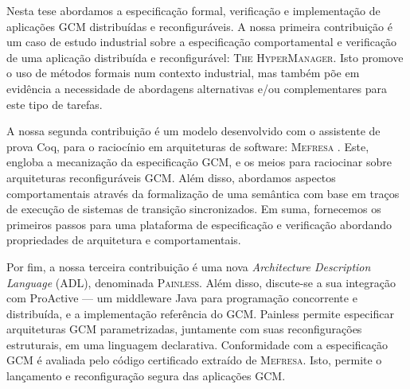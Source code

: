 Nesta tese abordamos a especificação formal, verificação e implementação de 
aplicações GCM distribuídas e reconfiguráveis​​. A nossa primeira contribuição é um caso de estudo industrial 
sobre a especificação comportamental e verificação de uma 
aplicação distribuída e reconfigurável: \textsc{The HyperManager}. 
Isto promove o uso de métodos formais num contexto industrial, 
mas também põe em evidência a necessidade de abordagens alternativas e/ou complementares 
para este tipo de tarefas. 

A nossa segunda contribuição é um modelo desenvolvido com o assistente de prova Coq, 
para o raciocínio em arquiteturas de software: \textsc{Mefresa} . Este, engloba 
a mecanização da especificação GCM, e os meios para 
raciocinar sobre arquiteturas reconfiguráveis ​​GCM. Além disso, abordamos 
aspectos comportamentais através da formalização de uma semântica com base em traços de execução de 
sistemas de transição sincronizados. 
Em suma, fornecemos os primeiros passos para uma plataforma de especificação e verificação 
abordando propriedades de arquitetura e comportamentais. 

Por fim, a nossa terceira contribuição é uma nova \textit{Architecture Description Language} (ADL), 
denominada \textsc{Painless}. Além disso, discute-se a sua integração com \textsf{ProActive} 
--- um middleware Java para programação concorrente e distribuída, 
e a implementação referência do GCM. 
\textsf{Painless} permite especificar arquiteturas GCM parametrizadas, juntamente com 
suas reconfigurações estruturais, em uma linguagem declarativa. Conformidade 
com a especificação GCM é avaliada pelo código certificado extraído de \textsc{Mefresa}. 
Isto, permite o lançamento e reconfiguração segura das aplicações GCM.


